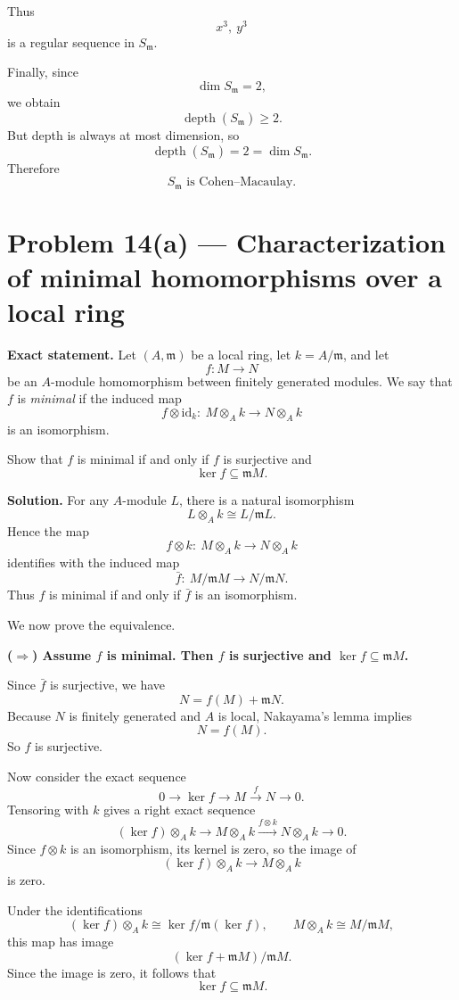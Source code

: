 \documentclass[12pt,a4paper]{article}
\theoremstyle{notespace}
\begin{document}
Thus
\[
x^3,\ y^3
\]
is a regular sequence in \(S_{\mathfrak m}\).

Finally, since
\[
\dim S_{\mathfrak m}=2,
\]
we obtain
\[
\operatorname{depth}(S_{\mathfrak m})\ge 2.
\]
But depth is always at most dimension, so
\[
\operatorname{depth}(S_{\mathfrak m})=2=\dim S_{\mathfrak m}.
\]
Therefore
\[
\boxed{S_{\mathfrak m}\text{ is Cohen--Macaulay}.}
\]

\section{Problem 14(a) --- Characterization of minimal homomorphisms over a local ring}

\textbf{Exact statement.}
Let \((A,\mathfrak m)\) be a local ring, let \(k=A/\mathfrak m\), and let
\[
f:M\to N
\]
be an \(A\)-module homomorphism between finitely generated modules. We say that \(f\) is \emph{minimal} if the induced map
\[
f\otimes \mathrm{id}_k:\ M\otimes_A k \to N\otimes_A k
\]
is an isomorphism.

Show that \(f\) is minimal if and only if \(f\) is surjective and
\[
\ker f\subseteq \mathfrak m M.
\]

\textbf{Solution.}
For any \(A\)-module \(L\), there is a natural isomorphism
\[
L\otimes_A k \cong L/\mathfrak m L.
\]
Hence the map
\[
f\otimes k:\ M\otimes_A k \to N\otimes_A k
\]
identifies with the induced map
\[
\bar f:\ M/\mathfrak m M \to N/\mathfrak m N.
\]
Thus \(f\) is minimal if and only if \(\bar f\) is an isomorphism.

We now prove the equivalence.

\medskip

\textbf{(\(\Rightarrow\)) Assume \(f\) is minimal. Then \(f\) is surjective and \(\ker f\subseteq \mathfrak m M\).}

Since \(\bar f\) is surjective, we have
\[
N=f(M)+\mathfrak m N.
\]
Because \(N\) is finitely generated and \(A\) is local, Nakayama's lemma implies
\[
N=f(M).
\]
So \(f\) is surjective.

Now consider the exact sequence
\[
0\to \ker f \to M \xrightarrow{f} N \to 0.
\]
Tensoring with \(k\) gives a right exact sequence
\[
(\ker f)\otimes_A k \to M\otimes_A k \xrightarrow{f\otimes k} N\otimes_A k \to 0.
\]
Since \(f\otimes k\) is an isomorphism, its kernel is zero, so the image of
\[
(\ker f)\otimes_A k \to M\otimes_A k
\]
is zero.

Under the identifications
\[
(\ker f)\otimes_A k \cong \ker f/\mathfrak m(\ker f),
\qquad
M\otimes_A k \cong M/\mathfrak m M,
\]
this map has image
\[
(\ker f+\mathfrak m M)/\mathfrak m M.
\]
Since the image is zero, it follows that
\[
\ker f\subseteq \mathfrak m M.
\]
\end{document}
